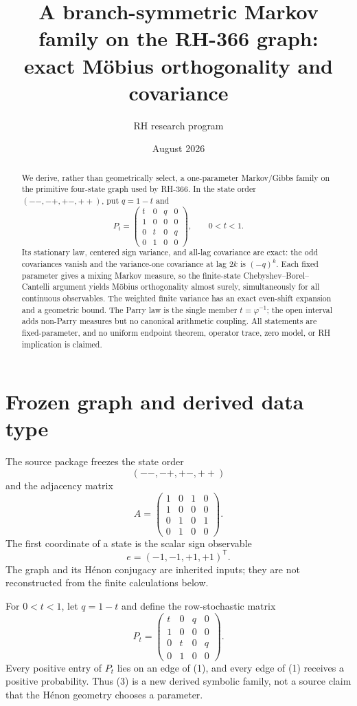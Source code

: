 \documentclass[11pt]{article}
\title{A branch-symmetric Markov family on the RH-366 graph:\\
exact Möbius orthogonality and covariance}
\author{RH research program}
\date{August 2026}
\begin{document}
\maketitle

\begin{abstract}
We derive, rather than geometrically select, a one-parameter Markov/Gibbs
family on the primitive four-state graph used by RH-366.  In the state order
$(--,-+,+-,++)$, put $q=1-t$ and
\[
 P_t=\begin{pmatrix}
 t&0&q&0\\
 1&0&0&0\\
 0&t&0&q\\
 0&1&0&0
 \end{pmatrix},\qquad 0<t<1.
\]
Its stationary law, centered sign variance, and all-lag covariance are exact:
the odd covariances vanish and the variance-one covariance at lag $2k$ is
$(-q)^k$.  Each fixed parameter gives a mixing Markov measure, so the
finite-state Chebyshev--Borel--Cantelli argument yields Möbius orthogonality
almost surely, simultaneously for all continuous observables.  The weighted
finite variance has an exact even-shift expansion and a geometric bound.
The Parry law is the single member $t=\varphi^{-1}$; the open interval adds
non-Parry measures but no canonical arithmetic coupling.  All statements are
fixed-parameter, and no uniform endpoint theorem, operator trace, zero model,
or RH implication is claimed.
\end{abstract}

\section{Frozen graph and derived data type}

The source package
\cite{HenonMobius2026} freezes the state order
\[
 (--,-+,+-,++)
\]
and the adjacency matrix
\[
 A=\begin{pmatrix}
 1&0&1&0\\
 1&0&0&0\\
 0&1&0&1\\
 0&1&0&0
 \end{pmatrix}.
 \tag{1}
\]
The first coordinate of a state is the scalar sign observable
\[
 e=(-1,-1,+1,+1)^{\mathsf T}. \tag{2}
\]
The graph and its Hénon conjugacy are inherited inputs; they are not
reconstructed from the finite calculations below.

For $0<t<1$, let $q=1-t$ and define the row-stochastic matrix
\[
 P_t=\begin{pmatrix}
 t&0&q&0\\
 1&0&0&0\\
 0&t&0&q\\
 0&1&0&0
 \end{pmatrix}. \tag{3}
\]
Every positive entry of $P_t$ lies on an edge of (1), and every edge of
(1) receives a positive probability.  Thus (3) is a new derived symbolic
family, not a source claim that the Hénon geometry chooses a parameter.
\end{document}
